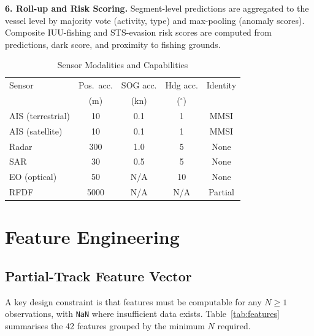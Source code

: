 \documentclass[journal]{IEEEtran}
\begin{document}
\textbf{6. Roll-up and Risk Scoring.}
Segment-level predictions are aggregated to the vessel level by majority
vote (activity, type) and max-pooling (anomaly scores). Composite
IUU-fishing and STS-evasion risk scores are computed from predictions,
dark score, and proximity to fishing grounds.

\begin{table}[!t]
  \caption{Sensor Modalities and Capabilities}
  \label{tab:sensors}
  \centering
  \begin{tabular}{lcccc}
    \toprule
    Sensor & Pos.\ acc. & SOG acc. & Hdg acc. & Identity \\
           & (m) & (kn) & ($^\circ$) & \\
    \midrule
    AIS (terrestrial) & 10   & 0.1 & 1  & MMSI \\
    AIS (satellite)   & 10   & 0.1 & 1  & MMSI \\
    Radar             & 300  & 1.0 & 5  & None \\
    SAR               & 30   & 0.5 & 5  & None \\
    EO (optical)      & 50   & N/A & 10 & None \\
    RFDF              & 5000 & N/A & N/A & Partial \\
    \bottomrule
  \end{tabular}
\end{table}

\section{Feature Engineering}
\label{sec:features}

\subsection{Partial-Track Feature Vector}

A key design constraint is that features must be computable for any
$N \geq 1$ observations, with \texttt{NaN} where insufficient data
exists. Table~\ref{tab:features} summarises the 42 features grouped by
the minimum $N$ required.
\end{document}
